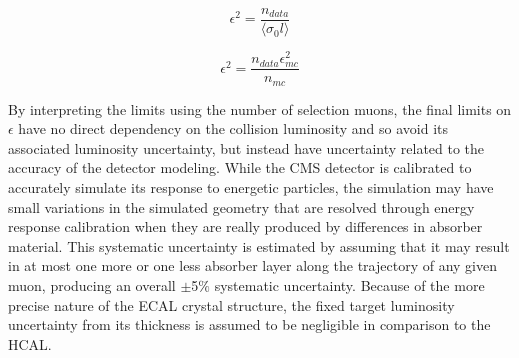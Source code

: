 \begin{equation}
	\label{eq:datarate}
	\epsilon^2 = \frac{n_{data}}{\langle \sigma_0 l\rangle}
\end{equation}

\begin{equation}
	\label{eq:fixedLumi}
	\epsilon^2 = \frac{n_{data}\epsilon_{mc}^2}{n_{mc}}  
\end{equation}

By interpreting the limits using the number of selection muons, the final limits on $\epsilon$ have no direct dependency on the collision luminosity and so avoid its associated luminosity uncertainty, but instead have uncertainty related to the accuracy of the detector modeling.
While the CMS detector is calibrated to accurately simulate its response to energetic particles, the simulation may have small variations in the simulated geometry that are resolved through energy response calibration when they are really produced by differences in absorber material.
This systematic uncertainty is estimated by assuming that it may result in at most one more or one less absorber layer along the trajectory of any given muon, producing an overall $\pm$5$\%$ systematic uncertainty.
Because of the more precise nature of the ECAL crystal structure, the fixed target luminosity uncertainty from its thickness is assumed to be negligible in comparison to the HCAL.
